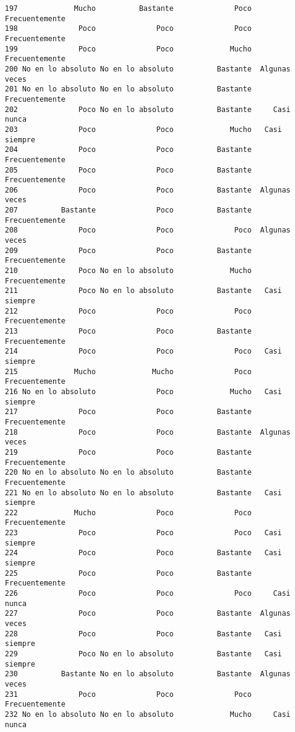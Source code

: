 \documentclass[
  letterpaper,
  DIV=11,
  numbers=noendperiod]{scrartcl}
\begin{document}
\begin{verbatim}
197             Mucho          Bastante              Poco Frecuentemente
198              Poco              Poco              Poco Frecuentemente
199              Poco              Poco             Mucho Frecuentemente
200 No en lo absoluto No en lo absoluto          Bastante  Algunas veces
201 No en lo absoluto No en lo absoluto          Bastante Frecuentemente
202              Poco No en lo absoluto          Bastante     Casi nunca
203              Poco              Poco             Mucho   Casi siempre
204              Poco              Poco          Bastante Frecuentemente
205              Poco              Poco          Bastante Frecuentemente
206              Poco              Poco          Bastante  Algunas veces
207          Bastante              Poco          Bastante Frecuentemente
208              Poco              Poco              Poco  Algunas veces
209              Poco              Poco          Bastante Frecuentemente
210              Poco No en lo absoluto             Mucho Frecuentemente
211              Poco No en lo absoluto          Bastante   Casi siempre
212              Poco              Poco              Poco Frecuentemente
213              Poco              Poco          Bastante Frecuentemente
214              Poco              Poco              Poco   Casi siempre
215             Mucho             Mucho              Poco Frecuentemente
216 No en lo absoluto              Poco             Mucho   Casi siempre
217              Poco              Poco          Bastante Frecuentemente
218              Poco              Poco          Bastante  Algunas veces
219              Poco              Poco          Bastante Frecuentemente
220 No en lo absoluto No en lo absoluto          Bastante Frecuentemente
221 No en lo absoluto No en lo absoluto          Bastante   Casi siempre
222             Mucho              Poco              Poco Frecuentemente
223              Poco              Poco              Poco   Casi siempre
224              Poco              Poco          Bastante   Casi siempre
225              Poco              Poco          Bastante Frecuentemente
226              Poco              Poco              Poco     Casi nunca
227              Poco              Poco          Bastante  Algunas veces
228              Poco              Poco          Bastante   Casi siempre
229              Poco No en lo absoluto          Bastante   Casi siempre
230          Bastante No en lo absoluto          Bastante  Algunas veces
231              Poco              Poco              Poco Frecuentemente
232 No en lo absoluto No en lo absoluto             Mucho     Casi nunca

\end{verbatim}
\end{document}
